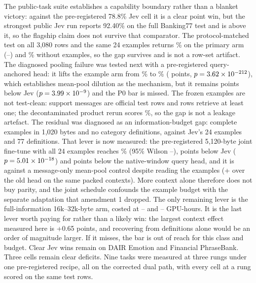 The public-task suite establishes a capability boundary rather than a blanket
victory: against the pre-registered 78.8\% Jev cell it is a clear point win, but
the strongest public Jev run reports 92.40\% on the full Banking77 test and is
above it, so the flagship claim does not survive that comparator. The
protocol-matched test on all 3{,}080 rows and the same 24 examples returns
\JevMatchPctAOne\% on the primary arm (\JevMatchAOneLo--\JevMatchAOneHi) and
\JevMatchPctNoEx\% without examples, so the gap survives and is not a row-set
artifact. The diagnosed pooling failure was tested next with a pre-registered
query-anchored head: it lifts the example arm from \QueryPctOldTwo\% to
\QueryPctQueryTwo\% (\QueryMechGain{} points, $p = 3.62\times10^{-212}$), which establishes
mean-pool dilution as the mechanism, but it remains \QueryDiffAbs{} points below
Jev ($p = 3.99\times10^{-9}$) and the P0 bar is missed. The frozen examples are not
test-clean: \ContamSupportMatches{} support messages are official test rows and
\ContamEvalRows{} rows retrieve at least one; the decontaminated product rerun
scores \ContamCleanAcc\%, so the gap is not a leakage artefact. The residual was diagnosed as
an information-budget gap: \QueryEff{} complete examples in 1{,}020 bytes and no
category definitions, against Jev's 24 examples and 77 definitions. That lever
is now measured: the pre-registered 5{,}120-byte joint fine-tune with all 24
examples reaches \LenPctLenTwo\% (95\% Wilson \LenLoLenTwo--\LenHiLenTwo),
\LenDiffAbs{} points below Jev ($p = 5.01\times10^{-18}$) and \LenNativeGapAbs{} points
below the native-window query head, and it is \LenVsOldZeroGain{} against a
message-only mean-pool control despite reading the examples (+\LenMechGainAbs{}
over the old head on the same packed contexts). More context alone therefore
does not buy parity, and the joint schedule confounds the example budget with
the separate adaptation that amendment 1 dropped. The only remaining lever is the
full-information 16k--32k-byte arm, costed at \LenNextShortLo--\LenNextShortHi{}
and \LenNextLongLo--\LenNextLongHi{} GPU-hours. It is the last lever worth
paying for rather than a likely win: the largest context effect measured here is
+0.65 points, and recovering \LenDiffAbs{} from definitions alone would be an
order of magnitude larger. If it misses, the bar is out of reach for this class
and budget.
Clear Jev wins remain
on DAIR Emotion and Financial PhraseBank. Three cells remain clear
deficits. Nine tasks were measured at three rungs under one
pre-registered recipe, all on
the corrected dual path, with every cell at a rung scored on the same test rows.
